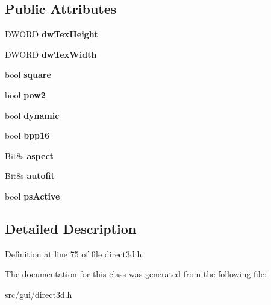 \subsection*{Public Attributes}
\begin{DoxyCompactItemize}
\item 
\hypertarget{classCDirect3D_a9cc53e0233f977505e05ee041f0caa78}{D\-W\-O\-R\-D {\bfseries dw\-Tex\-Height}}\label{classCDirect3D_a9cc53e0233f977505e05ee041f0caa78}

\item 
\hypertarget{classCDirect3D_a496f302fa81d3b230c5f78be2535ffb2}{D\-W\-O\-R\-D {\bfseries dw\-Tex\-Width}}\label{classCDirect3D_a496f302fa81d3b230c5f78be2535ffb2}

\item 
\hypertarget{classCDirect3D_a761f1a50d5d3c161632325c76ad10ea9}{bool {\bfseries square}}\label{classCDirect3D_a761f1a50d5d3c161632325c76ad10ea9}

\item 
\hypertarget{classCDirect3D_a78a14a9db1e8e6a30586bc0e069ecbaf}{bool {\bfseries pow2}}\label{classCDirect3D_a78a14a9db1e8e6a30586bc0e069ecbaf}

\item 
\hypertarget{classCDirect3D_a49900dc75b6079841da7ef707397af35}{bool {\bfseries dynamic}}\label{classCDirect3D_a49900dc75b6079841da7ef707397af35}

\item 
\hypertarget{classCDirect3D_aa9f4499c1c73595ff5faa5472cb247cd}{bool {\bfseries bpp16}}\label{classCDirect3D_aa9f4499c1c73595ff5faa5472cb247cd}

\item 
\hypertarget{classCDirect3D_a667ec11060e1b35a393aed95c134b1c8}{Bit8s {\bfseries aspect}}\label{classCDirect3D_a667ec11060e1b35a393aed95c134b1c8}

\item 
\hypertarget{classCDirect3D_a181bdf0499756c0ca5a300a34477bbe0}{Bit8s {\bfseries autofit}}\label{classCDirect3D_a181bdf0499756c0ca5a300a34477bbe0}

\item 
\hypertarget{classCDirect3D_af269336b17645f85062a82c545cd460a}{bool {\bfseries ps\-Active}}\label{classCDirect3D_af269336b17645f85062a82c545cd460a}

\end{DoxyCompactItemize}


\subsection{Detailed Description}


Definition at line 75 of file direct3d.\-h.



The documentation for this class was generated from the following file\-:\begin{DoxyCompactItemize}
\item 
src/gui/direct3d.\-h\end{DoxyCompactItemize}

